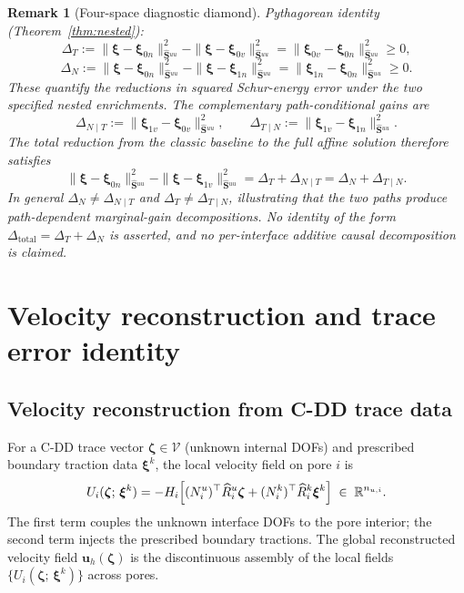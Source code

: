 \documentclass[11pt,a4paper]{article}
\newtheorem{remark}[theorem]{Remark}
\theoremstyle{definition}
\newcommand{\R}{\mathbb{R}}
\newcommand{\vel}{\bm{u}}
\newcommand{\Schur}{\mathbf{S}}
\newcommand{\Shatuu}{\widehat{\Schur}{}^{uu}}
\newcommand{\Vspace}{\mathcal{V}}
\begin{document}
\begin{remark}[Four-space diagnostic diamond]
  Pythagorean identity (Theorem~\ref{thm:nested}):
  \[
    \Delta_T
    := \|\bm{\xi}-\bm{\xi}_{0n}\|_{\Shatuu}^2
       -\|\bm{\xi}-\bm{\xi}_{0v}\|_{\Shatuu}^2
    = \|\bm{\xi}_{0v}-\bm{\xi}_{0n}\|_{\Shatuu}^2 \ge 0,
  \]
  \[
    \Delta_N
    := \|\bm{\xi}-\bm{\xi}_{0n}\|_{\Shatuu}^2
       -\|\bm{\xi}-\bm{\xi}_{1n}\|_{\Shatuu}^2
    = \|\bm{\xi}_{1n}-\bm{\xi}_{0n}\|_{\Shatuu}^2 \ge 0.
  \]
  These quantify the reductions in squared Schur-energy error under the
  two specified nested enrichments.  The complementary path-conditional
  gains are
  \[
    \Delta_{N\mid T}
    := \|\bm{\xi}_{1v}-\bm{\xi}_{0v}\|_{\Shatuu}^2,\qquad
    \Delta_{T\mid N}
    := \|\bm{\xi}_{1v}-\bm{\xi}_{1n}\|_{\Shatuu}^2.
  \]
  The total reduction from the classic baseline to the full affine
  solution therefore satisfies
  \[
    \|\bm{\xi}-\bm{\xi}_{0n}\|_{\Shatuu}^2
    -\|\bm{\xi}-\bm{\xi}_{1v}\|_{\Shatuu}^2
    = \Delta_T + \Delta_{N\mid T}
    = \Delta_N + \Delta_{T\mid N}.
  \]
  In general $\Delta_N \neq \Delta_{N\mid T}$ and
  $\Delta_T \neq \Delta_{T\mid N}$, illustrating that
  the two paths produce path-dependent marginal-gain decompositions.
  No identity of the form
  $\Delta_{\mathrm{total}} = \Delta_T + \Delta_N$ is asserted, and no
  per-interface additive causal decomposition is claimed.
\end{remark}

\section{Velocity reconstruction and trace error identity}

\subsection{Velocity reconstruction from C-DD trace data}

For a C-DD trace vector $\bm{\zeta}\in\Vspace$ (unknown internal DOFs)
and prescribed boundary traction data $\bm{\xi}^k$, the local velocity
field on pore $i$ is
\begin{equation}\label{eq:reconstruct}
  U_i(\bm{\zeta};\,\bm{\xi}^k)
  = -H_i\Bigl[(N_i^u)^\top \widehat{R}_i^u \bm{\zeta}
               + (N_i^k)^\top \widehat{R}_i^k \bm{\xi}^k\Bigr]
  \;\in\; \R^{n_{u,i}}.
\end{equation}
The first term couples the unknown interface DOFs to the pore
interior; the second term injects the prescribed boundary tractions.
The global reconstructed velocity field $\vel_h(\bm{\zeta})$ is the
discontinuous assembly of the local fields $\{U_i(\bm{\zeta};\,
\bm{\xi}^k)\}$ across pores.
\end{document}

